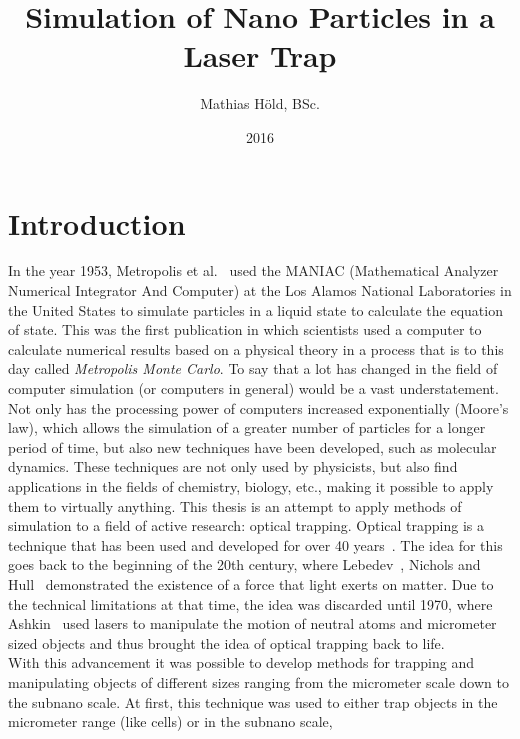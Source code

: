 \documentclass[12pt]{article}
\begin{document}
\title{Simulation of Nano Particles in a Laser Trap}
\author{Mathias H\"old, BSc.}
\date{2016}
\maketitle
\thispagestyle{empty}
\newpage
\tableofcontents
\newpage
\section{Introduction}
In the year 1953, Metropolis et al.~\cite{Metropolis1953} used the MANIAC (Mathematical Analyzer Numerical Integrator And Computer) 
at the Los Alamos National Laboratories in the United States to
simulate particles in a liquid state to calculate the equation of state. This was the first publication in which scientists used a computer to
calculate numerical results based on a physical theory in a process that is to this day called \textit{Metropolis Monte Carlo}. To say that a lot has
changed in the field of computer simulation (or computers in general) would be a vast understatement.\\
Not only has the processing power of computers increased exponentially (Moore's law), which allows the simulation of a greater number of particles for
a longer period of time, but also new techniques have been developed, such as molecular dynamics. These techniques are not only used by physicists,
but also find applications in the fields of chemistry, biology, etc., making it possible to apply them to virtually anything. This thesis is an
attempt to apply methods of simulation to a field of active research: optical trapping.
Optical trapping is a technique that has been used and developed for over 40 years~\cite{Marago2013}. The idea for this goes back to the beginning of
the 20th century, where Lebedev~\cite{Lebedew1901}, Nichols and Hull~\cite{Nichols1901} demonstrated the existence of a force that light exerts on 
matter. Due to the technical limitations at that time, the idea was discarded until 1970, where Ashkin~\cite{Ashkin2000} used lasers to manipulate the
motion of neutral atoms and micrometer sized objects and thus brought the idea of optical trapping back to life.\\
With this advancement it was possible to develop methods for trapping and manipulating objects of different sizes ranging from the micrometer scale
down to the subnano scale. At first, this technique was used to either trap objects in the micrometer range (like cells) or in the subnano scale,
\end{document}
